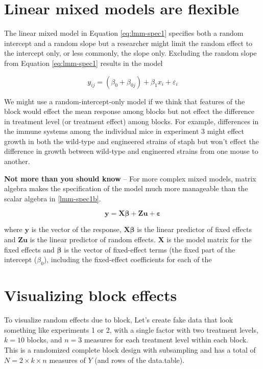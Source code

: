 \documentclass[]{book}
\begin{document}
\section{Linear mixed models are
flexible}\label{linear-mixed-models-are-flexible}

The linear mixed model in Equation \eqref{eq:lmm-spec1} specifies both a
random intercept and a random slope but a researcher might limit the
random effect to the intercept only, or less commonly, the slope only.
Excluding the random slope from Equation \eqref{eq:lmm-spec1} results in
the model

\begin{equation}
y_{ij} = (\beta_{0} + \beta_{0j}) + \beta_{1}x_i + \varepsilon_i 
\label{eq:lmm-spec1b}
\end{equation}

We might use a random-intercept-only model if we think that features of
the block would effect the mean response among blocks but not effect the
difference in treatment level (or treatment effect) among blocks. For
example, differences in the immune systems among the individual mice in
experiment 3 might effect growth in both the wild-type and engineered
strains of staph but won't effect the difference in growth between
wild-type and engineered strains from one mouse to another.

\textbf{Not more than you should know} -- For more complex mixed models,
matrix algebra makes the specification of the model much more manageable
than the scalar algebra in \ref{lmm-spec1b}.

\begin{equation}
\mathbf{y} = \mathbf{X}\boldsymbol{\beta} + \mathbf{Zu} + \boldsymbol{\varepsilon}
\end{equation}

where \(\mathbf{y}\) is the vector of the response,
\(\mathbf{X}\boldsymbol{\beta}\) is the linear predictor of fixed
effects and \(\mathbf{Zu}\) is the linear predictor of random effects.
\(\mathbf{X}\) is the model matrix for the fixed effects and
\(\boldsymbol{\beta}\) is the vector of fixed-effect terms (the fixed
part of the intercept (\(\beta_0\)), including the fixed-effect
coefficients for each of the

\section{Visualizing block effects}\label{visualizing-block-effects}

To visualize random effects due to block, Let's create fake data that
look something like experiments 1 or 2, with a single factor with two
treatment levels, \(k=10\) blocks, and \(n=3\) measures for each
treatment level within each block. This is a randomized complete block
design with subsampling and has a total of \(N=2 \times k \times n\)
measures of \(Y\) (and rows of the data.table).
\end{document}
